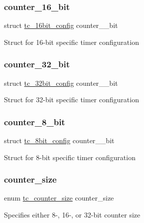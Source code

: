 \subsubsection{\texorpdfstring{counter\_16\_bit}{counter\_16\_bit}}
{\footnotesize\ttfamily struct \mbox{\hyperlink{structtc__16bit__config}{tc\+\_\+16bit\+\_\+config}} counter\+\_\+\_\+bit}

Struct for 16-\/bit specific timer configuration \mbox{\label{structtc__config_ab222fff8b8077a124494df5b661ec75b}} 
\subsubsection{\texorpdfstring{counter\_32\_bit}{counter\_32\_bit}}
{\footnotesize\ttfamily struct \mbox{\hyperlink{structtc__32bit__config}{tc\+\_\+32bit\+\_\+config}} counter\+\_\+\_\+bit}

Struct for 32-\/bit specific timer configuration \mbox{\label{structtc__config_aca10368efd9e0e99944c4caeb0e21631}} 
\subsubsection{\texorpdfstring{counter\_8\_bit}{counter\_8\_bit}}
{\footnotesize\ttfamily struct \mbox{\hyperlink{structtc__8bit__config}{tc\+\_\+8bit\+\_\+config}} counter\+\_\+\_\+bit}

Struct for 8-\/bit specific timer configuration \mbox{\label{structtc__config_aab0e5adb1f12875949e072f548ce2895}} 
\subsubsection{\texorpdfstring{counter\_size}{counter\_size}}
{\footnotesize\ttfamily enum \mbox{\hyperlink{group__asfdoc__sam0__tc__group_ga1b112627b81227c49c16b1a93e3321a0}{tc\+\_\+counter\+\_\+size}} counter\+\_\+size}

Specifies either 8-\/, 16-\/, or 32-\/bit counter size \mbox{\label{structtc__config_a37f9675f40e6cfd537b084547f489154}} 
